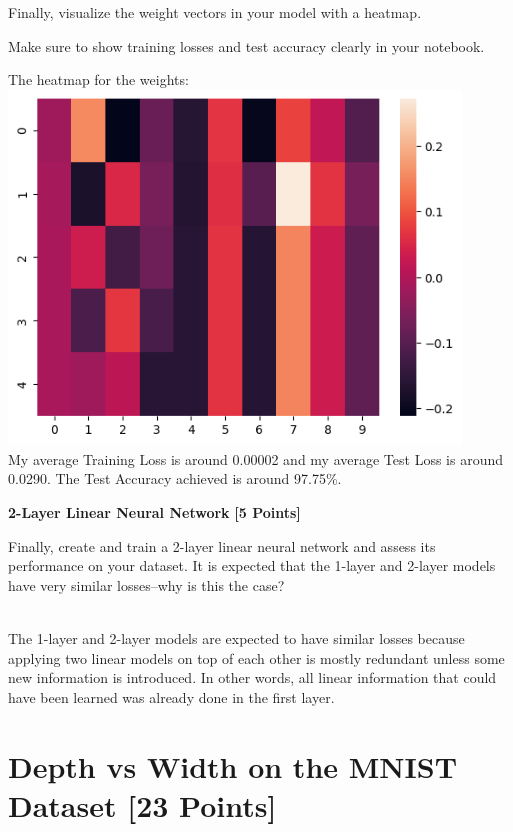 Finally, visualize the weight vectors in your model with a heatmap.

Make sure to show training losses and test accuracy clearly in your notebook.

\begin{solution}
  The heatmap for the weights:
  \\
  \includegraphics[width=12cm]{images/P2_C.png} \\
  My average Training Loss is around 0.00002 and my average Test Loss is around 0.0290. The Test Accuracy achieved is around 97.75\%.
\end{solution}


\problem \textbf{2-Layer Linear Neural Network} \textbf{[5 Points]}

Finally, create and train a 2-layer linear neural network and assess its performance on your dataset. It is expected that the 1-layer and 2-layer models have very similar losses--why is this the case?

\begin{solution}
  \\
  The 1-layer and 2-layer models are expected to have similar losses because applying two linear models on top of each other is mostly redundant unless some new information is introduced. In other words, all linear information that could have been learned was already done in the first layer.
\end{solution}





\newpage
\section{Depth vs Width on the MNIST Dataset  [23 Points]}

